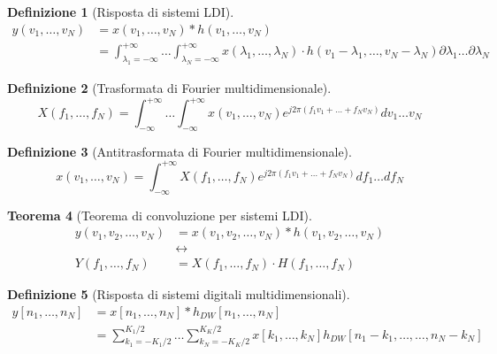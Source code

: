 \documentclass[a4paper,10pt]{article}
\theoremstyle{mystyle}
\newtheorem{theorem}{Teorema}[section]
\newtheorem{definition}[theorem]{Definizione}
\begin{document}
\begin{definition}[Risposta di sistemi LDI]
    \[
    \begin{aligned}
        y(v_1,\ldots, v_N)
        &= x(v_1, \ldots, v_N) * h(v_1, \ldots, v_N) \\
        &=\int_{\lambda_1 = -\infty}^{+\infty} \ldots \int_{\lambda_N = -\infty}^{+\infty} x(\lambda_1, \ldots, \lambda_N) \cdot h(v_1 -\lambda_1, \ldots, v_N - \lambda_N) \partial \lambda_1 \ldots \partial \lambda_N
    \end{aligned}
    \]
\end{definition}



\begin{definition}[Trasformata di Fourier multidimensionale]
    \[
        X(f_1, \ldots , f_N) = \int_{-\infty}^{+\infty} \ldots \int_{-\infty}^{+\infty} x(v_1, \ldots , v_N) e^{j 2 \pi (f_1 v_1 + \ldots + f_N v_N)} dv_1 \ldots v_N
    \]
\end{definition}

\begin{definition}[Antitrasformata di Fourier multidimensionale]
    \[
        x(v_1 , \ldots , v_N) = \int_{-\infty}^{+\infty} X(f_1 , \ldots , f_N) e^{j 2 \pi (f_1 v_1 + \ldots + f_N v_N)} df_1 \ldots df_N
    \]
\end{definition}

\begin{theorem}[Teorema di convoluzione per sistemi LDI]
    \[
    \begin{aligned}
        y(v_1,v_2, \ldots , v_N) &= x(v_1 , v_2 , \ldots , v_N) * h(v_1, v_2 , \ldots , v_N) \\
        &\leftrightarrow \\
        Y(f_1, \ldots , f_N) &= X(f_1 , \ldots , f_N) \cdot H(f_1, \ldots , f_N)
    \end{aligned}
    \]
\end{theorem}

\begin{definition}[Risposta di sistemi digitali multidimensionali]
    \[
        \begin{aligned}
            y[n_1,\ldots , n_N]
            &= x[n_1, \ldots , n_N] * h_{DW} [n_1, \ldots , n_N] \\
            &= \sum_{k_1 = - K_1/2}^{K_1/2} \ldots \sum_{k_N= - K_K /2}^{K_K /2} x[k_1 , \ldots , k_N] h_{DW} [n_1 - k_1, \ldots, \ldots , n_N - k_N]
        \end{aligned}
    \]
\end{definition}
\end{document}
